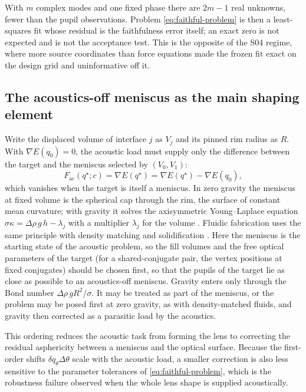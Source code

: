 \begin{remark}
With $m$ complex modes and one fixed phase there are $2m-1$ real unknowns,
fewer than the pupil observations. Problem \cref{eq:faithful-problem} is then
a least-squares fit whose residual is the faithfulness error itself; an exact
zero is not expected and is not the acceptance test. This is the opposite of
the S04 regime, where more source coordinates than force equations made the
frozen fit exact on the design grid and uninformative off it.
\end{remark}

\subsection{The acoustics-off meniscus as the main shaping element}
Write the displaced volume of interface $j$ as $V_j$ and its pinned rim radius
as $R$. With $\nabla E(q_0)=0$, the acoustic load must supply only the
difference between the target and the meniscus selected by $(V_0,V_1)$:
\begin{equation}
 F_{\mathrm{ac}}(q^\star;c)=\nabla E(q^\star)
 =\nabla E(q^\star)-\nabla E(q_0),
\end{equation}
which vanishes when the target is itself a meniscus. In zero gravity the
meniscus at fixed volume is the spherical cap through the rim, the surface of
constant mean curvature; with gravity it solves the axisymmetric
Young--Laplace equation $\sigma\kappa=\Delta\rho\,g\,h-\lambda_j$ with a
multiplier $\lambda_j$ for the volume \cite{finn1986}. Fluidic fabrication
uses the same principle with density matching and solidification
\cite{elgarisi2021}. Here the meniscus is the starting state of the acoustic
problem, so the fill volumes and the free optical parameters of the target
(for a shared-conjugate pair, the vertex positions at fixed conjugates)
should be chosen first, so that the pupils of the target lie as close as
possible to an acoustics-off meniscus. Gravity enters only through the Bond
number $\Delta\rho\,gR^2/\sigma$. It may be treated as part of the meniscus,
or the problem may be posed first at zero gravity, as with density-matched
fluids, and gravity then corrected as a parasitic load by the acoustics.

This ordering reduces the acoustic task from forming the lens to correcting
the residual asphericity between a meniscus and the optical surface. Because
the first-order shifts $\delta q_\theta\Delta\theta$ scale with the acoustic
load, a smaller correction is also less sensitive to the parameter tolerances
of \cref{eq:faithful-problem}, which is the robustness failure observed when
the whole lens shape is supplied acoustically.

